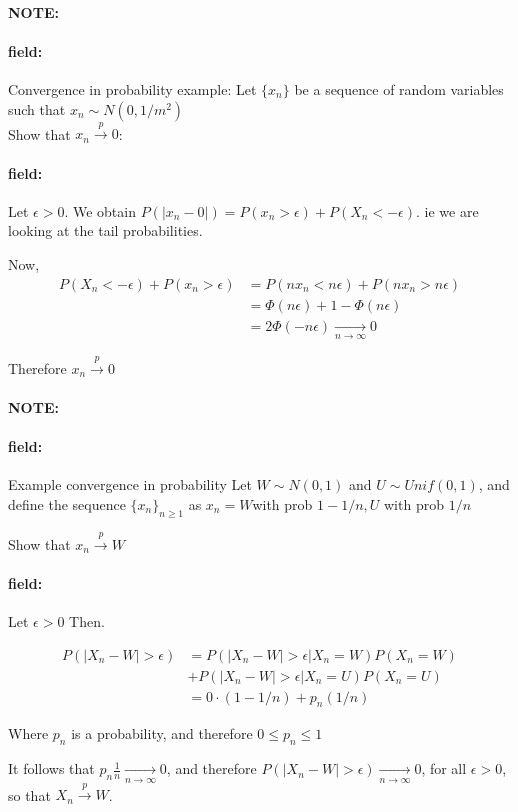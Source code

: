 \documentclass[12pt]{article}
\newenvironment{note}{\paragraph{NOTE:}}{}
\newenvironment{field}{\paragraph{field:}}{}
\begin{document}
\begin{note}
  \begin{field}
    Convergence in probability example:
    Let $\{x_n\}$ be a sequence of random variables such that $x_n \sim N(0,1/m^2)$\\
    Show that $x_n \overset{p}{\to} 0$:
  \end{field}
  \begin{field}
    Let $\epsilon > 0$. We obtain $P(|x_n - 0|) = P(x_n > \epsilon) + P(X_n < -\epsilon )$. ie we are looking at the tail probabilities.

    Now,
    \begin{align*}
      P(X_n < -\epsilon) + P(x_n > \epsilon) &=
      P(nx_n < n\epsilon) + P(nx_n > n\epsilon)\\
      &= \Phi(n\epsilon) + 1 - \Phi(n \epsilon)\\
      &= 2\Phi(-n\epsilon) \underset{n\to \infty}{\to}  0
    \end{align*}

    Therefore $x_n \overset{p}{\to} 0$
  \end{field}
\end{note}


\begin{note}
  \begin{field}
    Example convergence in probability
    Let $W \sim N(0,1)$ and $U \sim Unif(0,1)$, and define the sequence $\{x_n\}_{n \geq 1}$ as $x_n = W $with prob $1 - 1/n, U$ with prob $ 1/n$

    Show that $x_n \overset{p}{\to} W $

  \end{field}
  \begin{field}
    Let $\epsilon > 0$ Then.

    \begin{align*}
      P(|X_n - W| > \epsilon) &= P(|X_n - W| > \epsilon | X_n = W)P(X_n = W) \\
      &+ P(|X_n - W| > \epsilon | X_n = U)P(X_n = U)\\
      &= 0 \cdot (1 - 1/n) + p_n (1/n)
    \end{align*}

    Where $p_n  $ is a probability, and therefore $0 \leq p_n \leq 1 $

    It follows that $p_n \frac{1}{n} \underset{n \to \infty}{\to} 0$, and therefore $P(|X_n - W| > \epsilon ) \underset{n \to \infty}{\to} 0$, for all $\epsilon > 0$, so that $X_n \overset{p}{\to} W$.
  \end{field}
\end{note}
\end{document}
